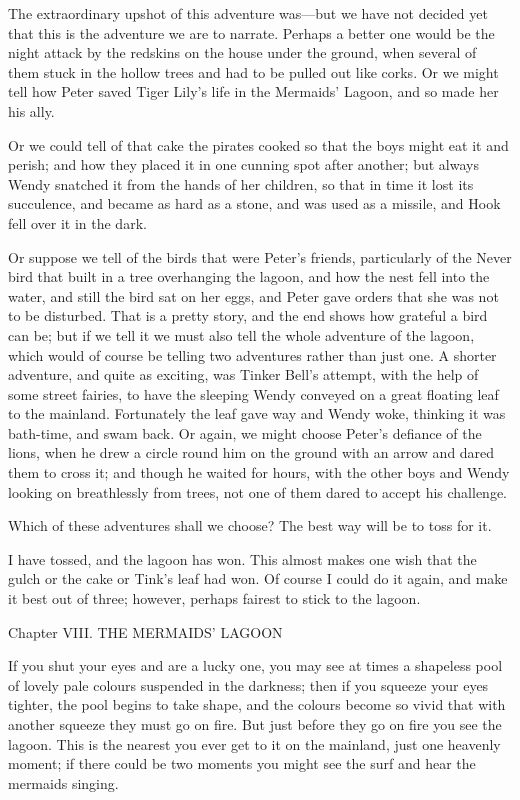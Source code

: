 The extraordinary upshot of this adventure was—but we have not decided
yet that this is the adventure we are to narrate. Perhaps a better one
would be the night attack by the redskins on the house under the
ground, when several of them stuck in the hollow trees and had to be
pulled out like corks. Or we might tell how Peter saved Tiger Lily's
life in the Mermaids' Lagoon, and so made her his ally.

Or we could tell of that cake the pirates cooked so that the boys might
eat it and perish; and how they placed it in one cunning spot after
another; but always Wendy snatched it from the hands of her children,
so that in time it lost its succulence, and became as hard as a stone,
and was used as a missile, and Hook fell over it in the dark.

Or suppose we tell of the birds that were Peter's friends, particularly
of the Never bird that built in a tree overhanging the lagoon, and how
the nest fell into the water, and still the bird sat on her eggs, and
Peter gave orders that she was not to be disturbed. That is a pretty
story, and the end shows how grateful a bird can be; but if we tell it
we must also tell the whole adventure of the lagoon, which would of
course be telling two adventures rather than just one. A shorter
adventure, and quite as exciting, was Tinker Bell's attempt, with the
help of some street fairies, to have the sleeping Wendy conveyed on a
great floating leaf to the mainland. Fortunately the leaf gave way and
Wendy woke, thinking it was bath-time, and swam back. Or again, we
might choose Peter's defiance of the lions, when he drew a circle round
him on the ground with an arrow and dared them to cross it; and though
he waited for hours, with the other boys and Wendy looking on
breathlessly from trees, not one of them dared to accept his challenge.

Which of these adventures shall we choose? The best way will be to toss
for it.

I have tossed, and the lagoon has won. This almost makes one wish that
the gulch or the cake or Tink's leaf had won. Of course I could do it
again, and make it best out of three; however, perhaps fairest to stick
to the lagoon.




Chapter VIII.
THE MERMAIDS' LAGOON


If you shut your eyes and are a lucky one, you may see at times a
shapeless pool of lovely pale colours suspended in the darkness; then
if you squeeze your eyes tighter, the pool begins to take shape, and
the colours become so vivid that with another squeeze they must go on
fire. But just before they go on fire you see the lagoon. This is the
nearest you ever get to it on the mainland, just one heavenly moment;
if there could be two moments you might see the surf and hear the
mermaids singing.


